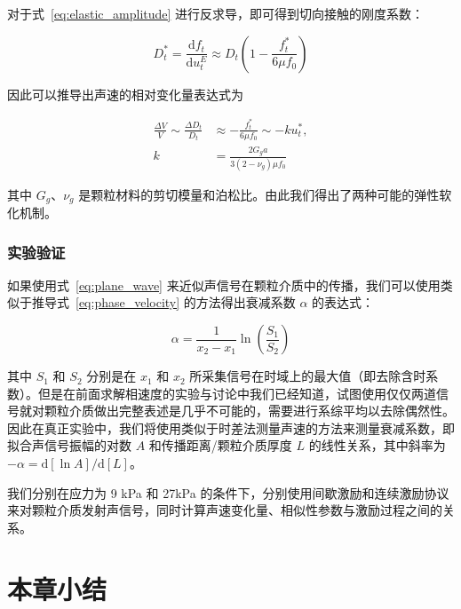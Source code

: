 对于式~\eqref{eq:elastic_amplitude} 进行反求导，即可得到切向接触的刚度系数：

\begin{equation}
  D_{t}^{*} = \frac{\mathrm{d}f_{t}}{\mathrm{d}u_{t}^{E}} \approx D_{t}\left(1 - \frac{f_{t}^{*}}{6\mu f_{0}}\right)
\end{equation}

因此可以推导出声速的相对变化量表达式为

\begin{align}
  \frac{\Delta V}{V}\sim \frac{\Delta D_{t}}{D_{t}} &\approx -\frac{f_{t}^{*}}{6\mu f_{0}} \sim -ku_{t}^{*},\\
  k &= \frac{2G_{g}a}{3(2-\nu_{g})\mu f_{0}}\label{eq:friction}
\end{align}

其中 $G_{g}$、$\nu_{g}$ 是颗粒材料的剪切模量和泊松比。由此我们得出了两种可能的弹性软化机制。

\subsubsection{实验验证}

如果使用式~\eqref{eq:plane_wave} 来近似声信号在颗粒介质中的传播，我们可以使用类似于推导式~\eqref{eq:phase_velocity} 的方法得出衰减系数 $\alpha$ 的表达式：

\begin{equation}
  \alpha = \frac{1}{x_{2}-x_{1}}\ln{\left(\frac{S_{1}}{S_{2}}\right)}
\end{equation}

其中 $S_{1}$ 和 $S_{2}$ 分别是在 $x_{1}$ 和 $x_{2}$ 所采集信号在时域上的最大值（即去除含时系数）。但是在前面求解相速度的实验与讨论中我们已经知道，试图使用仅仅两道信号就对颗粒介质做出完整表述是几乎不可能的，需要进行系综平均以去除偶然性。因此在真正实验中，我们将使用类似于时差法测量声速的方法来测量衰减系数，即拟合声信号振幅的对数 $A$ 和传播距离/颗粒介质厚度 $L$ 的线性关系，其中斜率为 $-\alpha = \mathrm{d}[\ln{A}]/\mathrm{d}[L]$。

我们分别在应力为 9 \unit{\kilo\pascal} 和 27\unit{\kilo\pascal} 的条件下，分别使用间歇激励和连续激励协议来对颗粒介质发射声信号，同时计算声速变化量、相似性参数与激励过程之间的关系。



\section{本章小结}